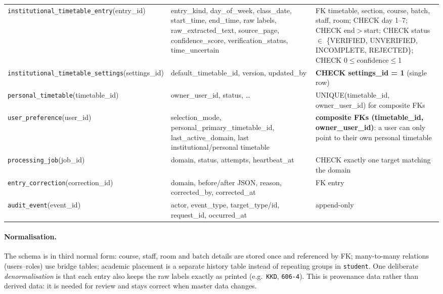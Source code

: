 \begin{longtable}{@{}>{\raggedright\arraybackslash}p{4.0cm}>{\raggedright\arraybackslash}p{5.6cm}>{\raggedright\arraybackslash}p{5.6cm}@{}}
\texttt{institutional\_\allowbreak{}timetable\_\allowbreak{}entry}\newline(entry\_id) & entry\_kind, day\_of\_week, class\_date, start\_time, end\_time, raw labels, raw\_extracted\_text, source\_page, confidence\_score, verification\_status, time\_uncertain & FK timetable, section, course, batch, staff, room; CHECK day 1--7; CHECK end$>$start; CHECK status $\in$ \{VERIFIED, UNVERIFIED, INCOMPLETE, REJECTED\}; CHECK 0$\le$confidence$\le$1\\
\texttt{institutional\_\allowbreak{}timetable\_\allowbreak{}settings}\newline(settings\_id) & default\_timetable\_id, version, updated\_by & \textbf{CHECK settings\_id = 1} (single row)\\
\texttt{personal\_\allowbreak{}timetable}\newline(timetable\_id) & owner\_user\_id, status, \ldots & UNIQUE(timetable\_id, owner\_user\_id) for composite FKs\\
\texttt{user\_\allowbreak{}preference}\newline(user\_id) & selection\_mode, personal\_primary\_timetable\_id, last\_active\_domain, last institutional/personal timetable & \textbf{composite FKs (timetable\_id, owner\_user\_id)}: a user can only point to their own personal timetable\\
\texttt{processing\_\allowbreak{}job}\newline(job\_id) & domain, status, attempts, heartbeat\_at & CHECK exactly one target matching the domain\\
\texttt{entry\_\allowbreak{}correction}\newline(correction\_id) & domain, before/after JSON, reason, corrected\_by, corrected\_at & FK entry\\
\texttt{audit\_\allowbreak{}event}\newline(event\_id) & actor, event\_type, target\_type/id, request\_id, occurred\_at & append-only\\
\bottomrule
\end{longtable}
\endgroup

\paragraph{Normalisation.}
The schema is in third normal form: course, staff, room and batch details are stored once and
referenced by FK; many-to-many relations (users--roles) use bridge tables; academic placement is a
separate history table instead of repeating groups in \texttt{student}. One deliberate
\emph{denormalisation} is that each entry also keeps the raw labels exactly as printed (e.g.\
\texttt{KKD}, \texttt{606-4}). This is provenance data rather than derived data: it is needed for
review and stays correct when master data changes.

